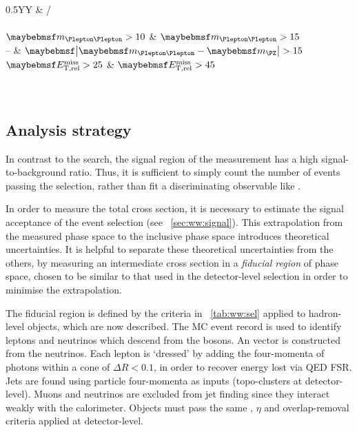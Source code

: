 \begin{description}
	\begin{table}[b]
		\begin{tabularx}{0.5\textwidth}{YY}
			\toprule
			\emch & \eech/\mmch \\
			\midrule
			 \\
			$\mll > 10$    & $\mll > 15$ \\
			--             & $\mods{\mll - \mZ} > 15$ \\
			$\calometrel > 25$ & $\calometrel > 45$ \\
			 \\
			 \\
			\bottomrule
		\end{tabularx}
		\caption{Summary of \WW event selection. Cuts are given in \GeV. The relevant observables are described in \Chapter~\ref{chap:selection}.}
		\label{tab:ww:sel}
	\end{table}

\end{description}



\subsection{Analysis strategy}
\label{sec:ww:strategy}

In contrast to the \HWW search, the signal region of the \WW measurement has a high 
signal-to-background ratio. Thus, it is sufficient to simply count the number of events 
passing the selection, rather than fit a discriminating observable like \mt.

In order to measure the total \WW cross section, it is necessary to estimate the signal 
acceptance of the event selection (see \Section~\ref{sec:ww:signal}). This extrapolation 
from the measured phase space to the inclusive phase space introduces theoretical 
uncertainties. It is helpful to separate these theoretical uncertainties from the others, 
by measuring an intermediate cross section in a \textit{fiducial region} of phase space, 
chosen to be similar to that used in the detector-level selection in order to minimise 
the extrapolation.

The fiducial region is defined by the criteria in \Table~\ref{tab:ww:sel} applied to 
hadron-level objects, which are now described. The MC event record is used to identify 
leptons and neutrinos which descend from the \PW bosons. An \truthmetvec vector is constructed 
from the neutrinos. Each lepton is `dressed' by adding the four-momenta of photons within a 
cone of $\Delta R < 0.1$, in order to recover energy lost via QED FSR. Jets are found 
using particle four-momenta as inputs (\cf topo-clusters at detector-level). Muons and 
neutrinos are excluded from jet finding since they interact weakly with the calorimeter. 
Objects must pass the same \pt, $\eta$ and overlap-removal criteria applied at 
detector-level.

